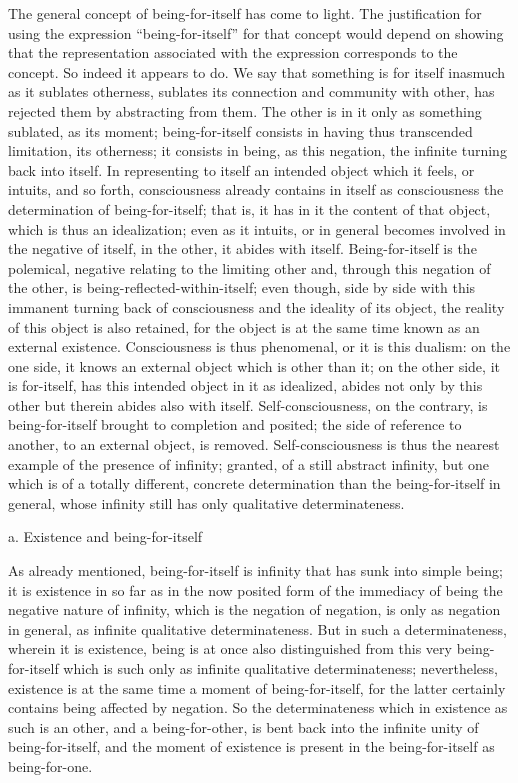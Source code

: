 The general concept of being-for-itself has come to light.
The justification for using the expression “being-for-itself”
for that concept would depend on showing that the representation
associated with the expression corresponds to the concept.
So indeed it appears to do.
We say that something is for itself
inasmuch as it sublates otherness,
sublates its connection and community with other,
has rejected them by abstracting from them.
The other is in it only as something sublated, as its moment;
being-for-itself consists in
having thus transcended limitation, its otherness;
it consists in being, as this negation,
the infinite turning back into itself.
In representing to itself an intended object
which it feels, or intuits, and so forth,
consciousness already contains in itself as consciousness
the determination of being-for-itself;
that is, it has in it the content of that object,
which is thus an idealization;
even as it intuits, or in general becomes involved in
the negative of itself, in the other, it abides with itself.
Being-for-itself is the polemical,
negative relating to the limiting other
and, through this negation of the other,
is being-reflected-within-itself;
even though, side by side with this
immanent turning back of consciousness
and the ideality of its object,
the reality of this object is also retained,
for the object is at the same time
known as an external existence.
Consciousness is thus phenomenal,
or it is this dualism:
on the one side, it knows an external object
which is other than it;
on the other side, it is for-itself,
has this intended object in it as idealized,
abides not only by this other
but therein abides also with itself.
Self-consciousness, on the contrary, is
being-for-itself brought to completion and posited;
the side of reference to another,
to an external object, is removed.
Self-consciousness is thus the nearest
example of the presence of infinity;
granted, of a still abstract infinity,
but one which is of a totally different, concrete determination
than the being-for-itself in general,
whose infinity still has only qualitative determinateness.

a. Existence and being-for-itself

As already mentioned, being-for-itself is
infinity that has sunk into simple being;
it is existence in so far as in the now posited form of the immediacy
of being the negative nature of infinity,
which is the negation of negation,
is only as negation in general,
as infinite qualitative determinateness.
But in such a determinateness, wherein it is existence,
being is at once also distinguished
from this very being-for-itself
which is such only as infinite
qualitative determinateness;
nevertheless, existence is at the same time
a moment of being-for-itself,
for the latter certainly contains
being affected by negation.
So the determinateness which in existence as such is
an other, and a being-for-other,
is bent back into the infinite unity of being-for-itself,
and the moment of existence is present
in the being-for-itself as being-for-one.

